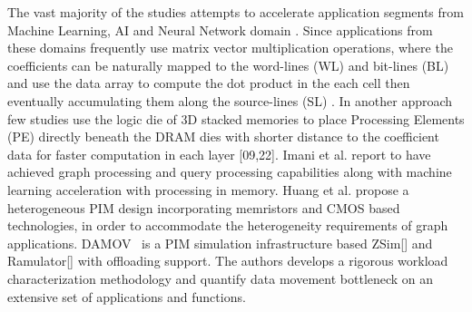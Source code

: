 The vast majority of the studies attempts to accelerate application segments from Machine Learning, AI and Neural Network domain \cite{03,04,08,09,10,11,14,15,16,18,19,20,22,29,31}. Since applications from these domains frequently use matrix vector multiplication operations, where the coefficients can be naturally mapped to the word-lines (WL) and bit-lines (BL) and use the data array to compute the dot product in the each cell then eventually accumulating them along the source-lines (SL) \cite{15,20}. In another approach few studies use the logic die of 3D stacked memories to place Processing Elements (PE) directly beneath the DRAM dies with shorter distance to the coefficient data for faster computation in each layer [09,22]. Imani et al. \cite{6} report to have achieved graph processing and query processing capabilities along with machine learning acceleration with processing in memory. Huang et al. \cite{33} propose a heterogeneous PIM design incorporating memristors and CMOS based technologies, in order to accommodate the heterogeneity requirements of graph applications. DAMOV~\cite{71} is a PIM simulation infrastructure based ZSim[] and Ramulator[] with offloading support. The authors develops a rigorous workload characterization methodology and quantify data movement bottleneck on an extensive set of applications and functions.     

